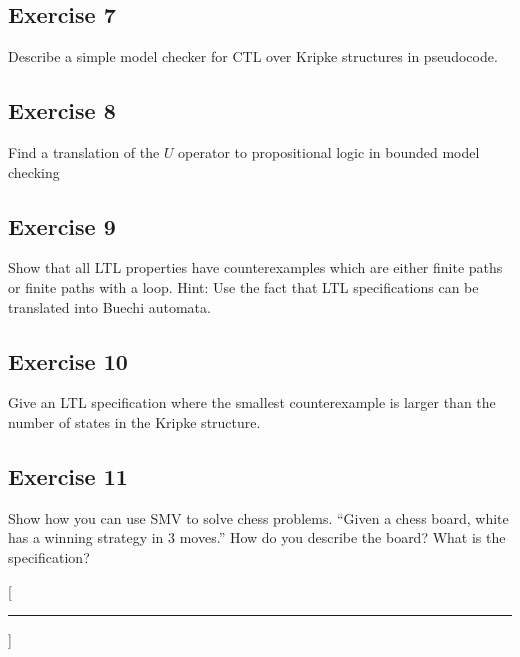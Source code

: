 \documentclass[a4paper, 12pt]{article}
\begin{document}
\subsection{Exercise 7}

Describe a simple model checker for CTL over Kripke structures in pseudocode.

\subsection{Exercise 8}

Find a translation of the $U$ operator to propositional logic in bounded model
checking
\subsection{Exercise 9}

Show that all LTL properties have counterexamples which are either finite
paths or finite paths with a loop. Hint: Use the fact that LTL specifications
can be translated into Buechi automata.

\subsection{Exercise 10}

Give an LTL specification where the smallest counterexample is larger than the
number of states in the Kripke structure.

\subsection{Exercise 11}

Show how you can use SMV to solve chess problems. “Given a chess board, white
has a winning strategy in 3 moves.” How do you describe the board? What is
the specification?


\titleformat{\section}{\sffamily\bfseries}{}{0pt}{}[{\color{aqua}\hrule}]
\printbibliography
\end{document}
